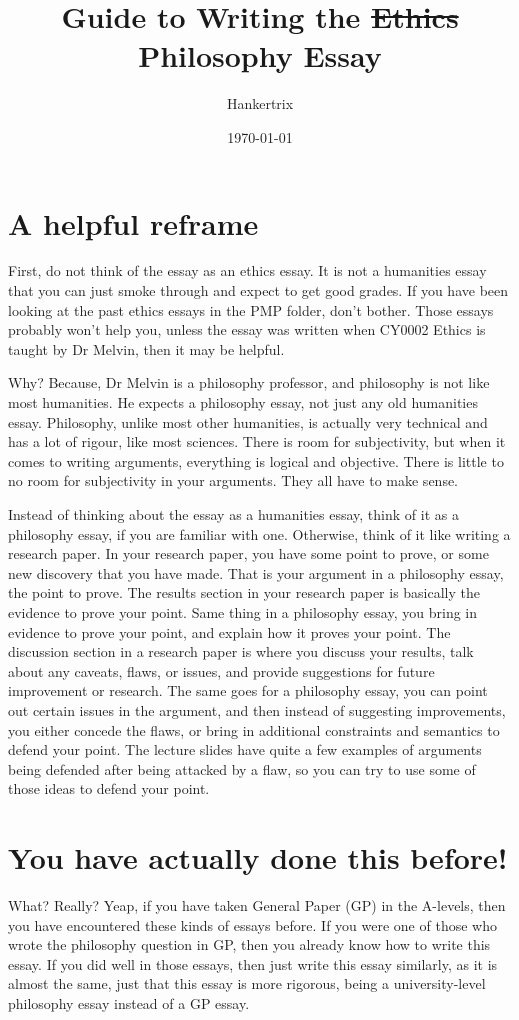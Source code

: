 \documentclass[11pt]{article}
\author{Hankertrix}
\date{\today}
\title{Guide to Writing the \sout{Ethics} Philosophy Essay}
\begin{document}
\maketitle
\setcounter{tocdepth}{2}
\tableofcontents \clearpage\section{A helpful reframe}
\label{sec:orgd1df3d8}
First, do not think of the essay as an ethics essay. It is not a humanities essay that you can just smoke through and expect to get good grades. If you have been looking at the past ethics essays in the PMP folder, don't bother. Those essays probably won't help you, unless the essay was written when CY0002 Ethics is taught by Dr Melvin, then it may be helpful.

Why? Because, Dr Melvin is a philosophy professor, and philosophy is not like most humanities. He expects a philosophy essay, not just any old humanities essay. Philosophy, unlike most other humanities, is actually very technical and has a lot of rigour, like most sciences. There is room for subjectivity, but when it comes to writing arguments, everything is logical and objective. There is little to no room for subjectivity in your arguments. They all have to make sense.

Instead of thinking about the essay as a humanities essay, think of it as a philosophy essay, if you are familiar with one. Otherwise, think of it like writing a research paper. In your research paper, you have some point to prove, or some new discovery that you have made. That is your argument in a philosophy essay, the point to prove. The results section in your research paper is basically the evidence to prove your point. Same thing in a philosophy essay, you bring in evidence to prove your point, and explain how it proves your point. The discussion section in a research paper is where you discuss your results, talk about any caveats, flaws, or issues, and provide suggestions for future improvement or research. The same goes for a philosophy essay, you can point out certain issues in the argument, and then instead of suggesting improvements, you either concede the flaws, or bring in additional constraints and semantics to defend your point. The lecture slides have quite a few examples of arguments being defended after being attacked by a flaw, so you can try to use some of those ideas to defend your point.
\section{You have actually done this before!}
\label{sec:org5a73955}
What? Really? Yeap, if you have taken General Paper (GP) in the A-levels, then you have encountered these kinds of essays before. If you were one of those who wrote the philosophy question in GP, then you already know how to write this essay. If you did well in those essays, then just write this essay similarly, as it is almost the same, just that this essay is more rigorous, being a university-level philosophy essay instead of a GP essay.
\end{document}
